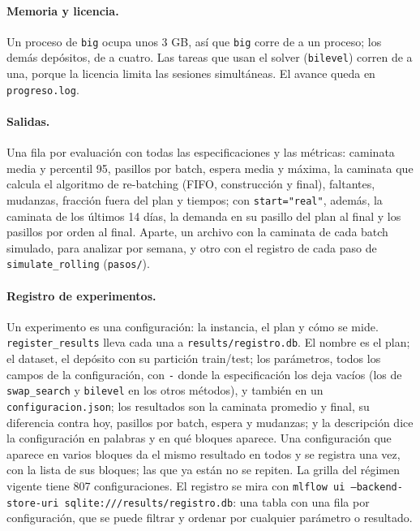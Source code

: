 \documentclass[11pt,a4paper,oneside]{report}
\newcommand{\code}[1]{\texttt{\small #1}}
\begin{document}
\paragraph{Memoria y licencia.} Un proceso de \code{big} ocupa unos 3 GB, así que \code{big}
corre de a un proceso; los demás depósitos, de a cuatro. Las tareas que usan el solver
(\code{bilevel}) corren de a una, porque la licencia limita las sesiones simultáneas. El avance
queda en \code{progreso.log}.

\paragraph{Salidas.} Una fila por evaluación con todas las especificaciones y las métricas:
caminata media y percentil 95, pasillos por batch, espera media y máxima, la caminata que
calcula el algoritmo de re-batching (FIFO, construcción y final), faltantes, mudanzas, fracción
fuera del plan y tiempos; con \code{start="real"}, además, la caminata de los últimos 14 días,
la demanda en su pasillo del plan al final y los pasillos por orden al final. Aparte, un
archivo con la caminata de cada batch simulado, para analizar por semana, y otro con el registro
de cada paso de \code{simulate\_rolling} (\code{pasos/}).

\paragraph{Registro de experimentos.} Un experimento es una configuración: la instancia, el plan
y cómo se mide. \code{register\_results} lleva cada una a \code{results/registro.db}. El nombre
es el plan; el dataset, el depósito con su partición train/test; los parámetros, todos los
campos de la configuración, con \code{-} donde la especificación los deja vacíos (los de
\code{swap\_search} y \code{bilevel} en los otros métodos), y también en un
\code{configuracion.json}; los resultados son la caminata promedio y
final, su diferencia contra hoy, pasillos por batch, espera y mudanzas; y la descripción dice la
configuración en palabras y en qué bloques aparece. Una configuración que
aparece en varios bloques da el mismo resultado en todos y se registra una vez, con la lista de
sus bloques; las que ya están no se repiten. La grilla del régimen vigente tiene 807
configuraciones. El registro se mira con
\code{mlflow ui --backend-store-uri sqlite:///results/registro.db}: una tabla con una fila por
configuración, que se puede filtrar y ordenar por cualquier parámetro o resultado.
\end{document}
